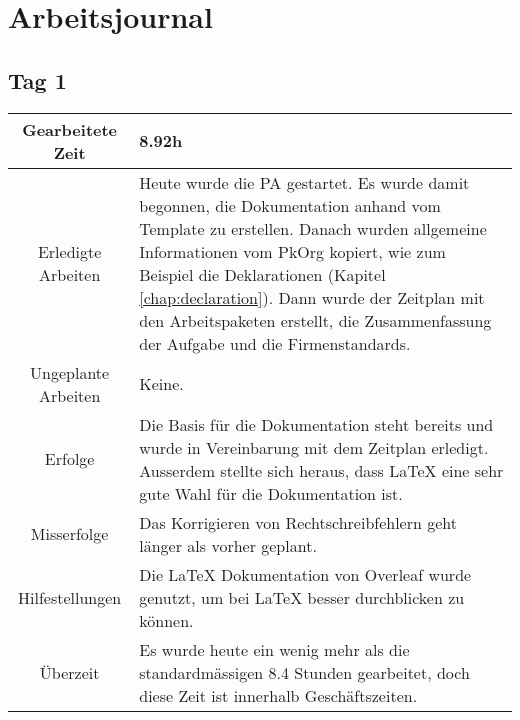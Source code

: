 \chapter{Arbeitsjournal}

\section{Tag 1}
\begin{tabularx}{\textwidth}[H]{|c|X|}
  \hline
  Gearbeitete Zeit & 8.92h \\ \hline
  Erledigte Arbeiten & Heute wurde die PA gestartet. Es wurde damit begonnen, die Dokumentation anhand vom Template
  \cite{Buhler_ipa-template_2022} zu erstellen. Danach wurden allgemeine Informationen vom PkOrg kopiert, wie zum
  Beispiel die Deklarationen (Kapitel \ref{chap:declaration}).
  Dann wurde der Zeitplan mit den Arbeitspaketen erstellt, die Zusammenfassung der Aufgabe und die
  Firmenstandards. \\ \hline
  Ungeplante Arbeiten & Keine. \\ \hline
  Erfolge & Die Basis für die Dokumentation steht bereits und wurde in Vereinbarung mit dem Zeitplan erledigt. Ausserdem stellte
  sich heraus, dass LaTeX eine sehr gute Wahl für die Dokumentation ist.
  \\ \hline
  Misserfolge & Das Korrigieren von Rechtschreibfehlern geht länger als vorher geplant.  \\ \hline
  Hilfestellungen & Die LaTeX Dokumentation von Overleaf \cite{overleaf} wurde genutzt, um bei LaTeX besser durchblicken zu
  können. \\ \hline
  Überzeit & Es wurde heute ein wenig mehr als die standardmässigen 8.4 Stunden gearbeitet, doch diese Zeit ist
  innerhalb Geschäftszeiten. \\ \hline
\end{tabularx}

\newpage

